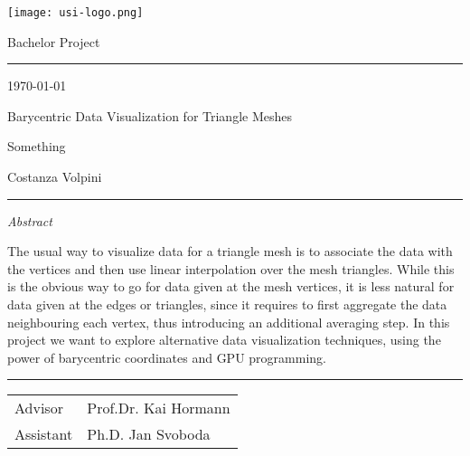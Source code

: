 \documentclass[12pt]{article}
\theoremstyle{definition}
\theoremstyle{definition}
\theoremstyle{plain}
\theoremstyle{plain}
\theoremstyle{plain}
\theoremstyle{plain}
\theoremstyle{definition}
\theoremstyle{remark}
\theoremstyle{remark}
\theoremstyle{remark}
\theoremstyle{remark}
\newcommand{\SUPERTITLE}{Bachelor Project}
\newcommand{\TITLE}{Barycentric Data Visualization for Triangle Meshes}
\newcommand{\SUBTITLE}{Something}
\newcommand{\AUTHOR}{Costanza Volpini}
\newcommand{\ADVISOR}{Prof.Dr. Kai Hormann}
\newcommand{\ASSISTANT}{Ph.D. Jan Svoboda}
\begin{document}

\thispagestyle{empty}

\texttt{[image: usi-logo.png]} \vspace{-1.42cm}

\begin{flushright}
  {\large \SUPERTITLE}\vspace{-.5cm}

  \rule{0.925\textwidth}{0.4pt}\vspace{-.2cm}

  {\small \today}
\end{flushright}

\vspace{2cm} {\fontsize{20pt}{20pt}\selectfont \TITLE }

{\SUBTITLE}

\vspace{1cm} {\Large \AUTHOR}

\vspace{-.2cm}\rule{\textwidth}{0.4pt}

\textit{Abstract}

The usual way to visualize data for a triangle mesh is to associate the data with the vertices and then use linear interpolation over the mesh triangles. While this is the obvious way to go for data given at the mesh vertices, it is less natural for data given at the edges or triangles, since it requires to first aggregate the data neighbouring each vertex, thus introducing an additional averaging step.
In this project we want to explore alternative data visualization techniques, using the power of barycentric coordinates and GPU programming.

\lipsum[1]

\vspace{\fill}
\rule{\textwidth}{0.4pt}

\begin{small}
  \begin{tabular}{@{}ll@{}}
    Advisor   & \ADVISOR   \\
    Assistant & \ASSISTANT
  \end{tabular}
\end{small}
\end{document}
